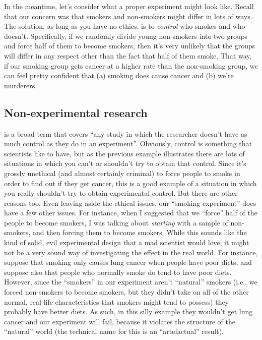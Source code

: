 In the meantime, let's consider what a proper experiment might look like. Recall that our concern was that smokers and non-smokers might differ in lots of ways. The solution, as long as you have no ethics, is to {\it control} who smokes and who doesn't. Specifically, if we randomly divide young non-smokers into two groups and force half of them to become smokers, then it's very unlikely that the groups will differ in any respect other than the fact that half of them smoke. That way, if our smoking group gets cancer at a higher rate than the non-smoking group, we can feel pretty confident that (a) smoking does cause cancer and (b) we're murderers. 

\subsection{Non-experimental research}

 is a broad term that covers ``any study in which the researcher doesn't have as much control as they do in an experiment''. Obviously, control is something that scientists like to have, but as the previous example illustrates there are lots of situations in which you can't or shouldn't try to obtain that control. Since it's  grossly unethical (and almost certainly criminal) to force people to smoke in order to find out if they get cancer, this is a good example of a situation in which you really shouldn't try to obtain experimental control. But there are other reasons too. Even leaving aside the ethical issues, our ``smoking experiment'' does have a few other issues. For instance, when I suggested that we ``force'' half of the people to become smokers, I was talking about {\it starting} with a sample of non-smokers, and then forcing them to become smokers. While this sounds like the kind of solid, evil experimental design that a mad scientist would love, it might not be a very sound way of investigating the effect in the real world. For instance, suppose that smoking only causes lung cancer when people have poor diets, and suppose also that people who normally smoke do tend to have poor diets. However, since the ``smokers'' in our experiment aren't ``natural'' smokers (i.e., we forced non-smokers to become smokers, but they didn't take on all of the other normal, real life characteristics that smokers might tend to possess) they probably have better diets. As such, in this silly example they wouldn't get lung cancer and our experiment will fail, because it violates the structure of the ``natural'' world (the technical name for this is an ``artefactual'' result).

